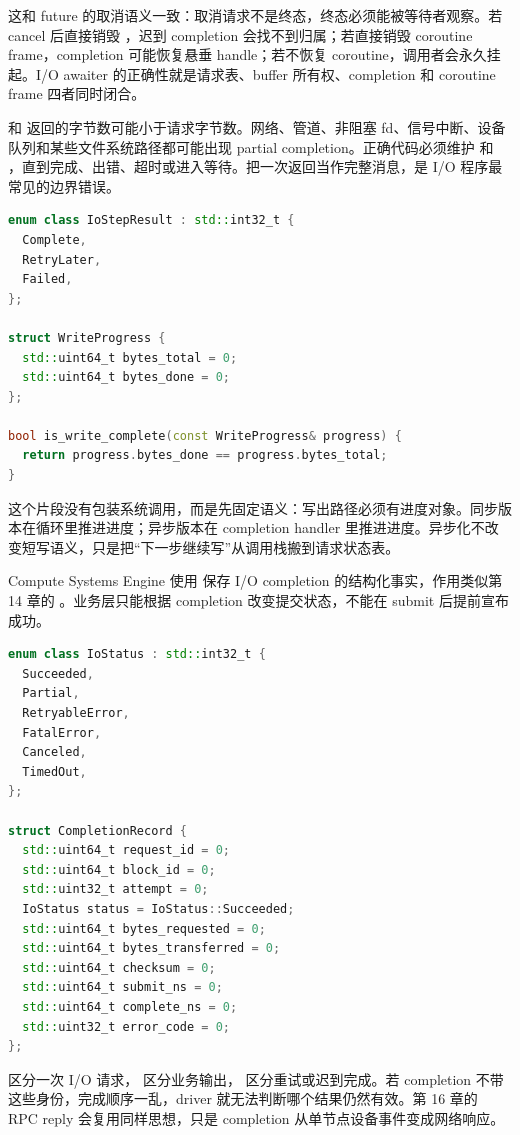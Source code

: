 这和 future 的取消语义一致：取消请求不是终态，终态必须能被等待者观察。若 cancel 后直接销毁 ，迟到 completion 会找不到归属；若直接销毁 coroutine frame，completion 可能恢复悬垂 handle；若不恢复 coroutine，调用者会永久挂起。I/O awaiter 的正确性就是请求表、buffer 所有权、completion 和 coroutine frame 四者同时闭合。

 和  返回的字节数可能小于请求字节数。网络、管道、非阻塞 fd、信号中断、设备队列和某些文件系统路径都可能出现 partial completion。正确代码必须维护  和 ，直到完成、出错、超时或进入等待。把一次返回当作完整消息，是 I/O 程序最常见的边界错误。

\begin{lstlisting}[language=C++,caption={同步可靠写循环的示例形态}]
enum class IoStepResult : std::int32_t {
  Complete,
  RetryLater,
  Failed,
};

struct WriteProgress {
  std::uint64_t bytes_total = 0;
  std::uint64_t bytes_done = 0;
};

bool is_write_complete(const WriteProgress& progress) {
  return progress.bytes_done == progress.bytes_total;
}
\end{lstlisting}

这个片段没有包装系统调用，而是先固定语义：写出路径必须有进度对象。同步版本在循环里推进进度；异步版本在 completion handler 里推进进度。异步化不改变短写语义，只是把“下一步继续写”从调用栈搬到请求状态表。

Compute Systems Engine 使用  保存 I/O completion 的结构化事实，作用类似第 14 章的 。业务层只能根据 completion 改变提交状态，不能在 submit 后提前宣布成功。

\begin{lstlisting}[language=C++,caption={CompletionRecord 的示例形态}]
enum class IoStatus : std::int32_t {
  Succeeded,
  Partial,
  RetryableError,
  FatalError,
  Canceled,
  TimedOut,
};

struct CompletionRecord {
  std::uint64_t request_id = 0;
  std::uint64_t block_id = 0;
  std::uint32_t attempt = 0;
  IoStatus status = IoStatus::Succeeded;
  std::uint64_t bytes_requested = 0;
  std::uint64_t bytes_transferred = 0;
  std::uint64_t checksum = 0;
  std::uint64_t submit_ns = 0;
  std::uint64_t complete_ns = 0;
  std::uint32_t error_code = 0;
};
\end{lstlisting}

 区分一次 I/O 请求， 区分业务输出， 区分重试或迟到完成。若 completion 不带这些身份，完成顺序一乱，driver 就无法判断哪个结果仍然有效。第 16 章的 RPC reply 会复用同样思想，只是 completion 从单节点设备事件变成网络响应。

